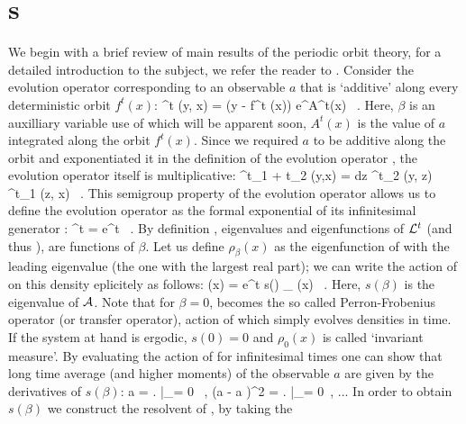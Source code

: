 \section{\CycForm s}
\label{s:DynAvers}
We begin with a brief review of main results of the periodic 
orbit theory, for a detailed introduction to the subject, we refer the reader to 
. Consider the evolution operator corresponding to an observable 
$a$ that is `additive' along every deterministic orbit $f^t(x)$:
\beq
	\Lop^t (y, x) = \delta (y - f^t (x)) e^{\beta A^t(x)} \, .
	\label{eq-EvOp}
\eeq
Here, $\beta$ is an auxilliary variable use of which will be apparent soon, 
$A^t (x)$ is the value of $a$ integrated along the orbit $f^t(x)$.
Since we required $a$ to be additive along the orbit and exponentiated
it in the definition of the evolution operator , the
evolution operator itself is multiplicative:
\beq
	\Lop^{t_1 + t_2} (y,x) = \int dz \Lop^{t_2} (y, z) \Lop^{t_1} (z, x) \, . 
	\label{eq-SemiGroup}
\eeq
This semigroup property of the evolution operator allows us to define
the evolution operator as the formal exponential of its infinitesimal
generator \Aop :
\beq
	\Lop^t = e^{\Aop t} \, . 
	\label{eq-EvOpExp}
\eeq 
By definition , eigenvalues and eigenfunctions of ${\cal L}^t$ (and 
thus \Aop ), are functions of $\beta$. Let us define $\rho_{\beta} (x)$ as the 
eigenfunction of  with the leading eigenvalue (the one with the 
largest real part); we can write the action of  on this density 
eplicitely as follows:
\beq
     (x) = e^{t s(\beta )} \rho_{\beta} (x) \, .
    \label{eq-EigenvalueRel}
\eeq
Here, $s(\beta)$ is the eigenvalue of ${\cal A}$. Note that for $\beta = 0$, 
 becomes the so called Perron-Frobenius operator (or transfer operator),
action of which simply evolves densities in time. If the system at hand is ergodic, 
$s(0) = 0$ and $\rho_0 (x)$ is called `invariant measure'. By evaluating the action 
of  for infinitesimal times one can show that long time average
(and higher moments) of the observable $a$ are given by the derivatives of $s(\beta)$:
\beq
    \langle a \rangle = \left.  \right|_{\beta = 0} \, , \quad
    \langle (a - \langle a \rangle )^2 \rangle = \left.  
                                                     \right|_{\beta = 0} \,, ...
    \label{eq-moments}                                                    
\eeq
In order to obtain $s(\beta)$ we construct the resolvent of \Aop , by taking the 
